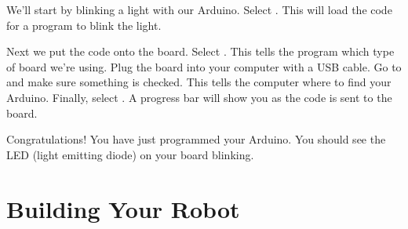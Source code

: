 \documentclass[letterpaper]{article}
\begin{document}
We'll start by blinking a light with our Arduino.
Select .
This will load the code for a program to blink the light.

Next we put the code onto the board.
Select .
This tells the program which type of board we're using.
Plug the board into your computer with a USB cable.
Go to  and make sure something is checked.
This tells the computer where to find your Arduino.
Finally, select .
A progress bar will show you as the code is sent to the board.

Congratulations!
You have just programmed your Arduino.
You should see the LED (light emitting diode) on your board blinking.

\section{Building Your Robot}
\label{sec:wiring_your_robot}



\clearpage


\end{document}
